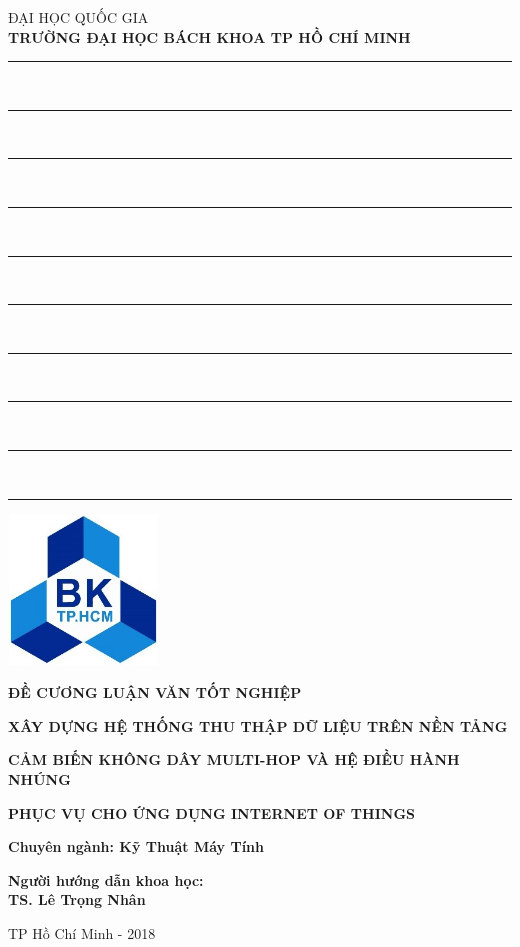 \begin{titlepage}
\begin{center}
{ĐẠI HỌC QUỐC GIA}\\
{\bf TRƯỜNG ĐẠI HỌC BÁCH KHOA TP HỒ CHÍ MINH}\\
\rule{0.1in}{1pt}\ \rule{0.1in}{1pt}\ \rule{0.1in}{1pt}\ \rule{0.1in}{1pt}\ \rule{0.1in}{1pt}\ \rule{0.1in}{1pt}\ \rule{0.1in}{1pt}\ \rule{0.1in}{1pt}\ \rule{0.1in}{1pt}\ \rule{0.1in}{1pt}
\end{center}

\begin{center}
\includegraphics[width=4cm,height=4cm]{logo.jpg}\\
\end{center}

\vspace{0.5cm}
\begin{center}
 {\bf {ĐỀ CƯƠNG LUẬN VĂN TỐT NGHIỆP}}
\end{center}
\vspace{0.7cm}

\begin{center}
\centerline{\bf \td XÂY DỰNG HỆ THỐNG THU THẬP DỮ LIỆU TRÊN NỀN TẢNG}
\vspace{.4 cm}
\centerline{\bf \td  CẢM BIẾN KHÔNG DÂY  MULTI-HOP VÀ HỆ ĐIỀU HÀNH NHÚNG}
\vspace{0.4 cm}
\centerline{\bf \td PHỤC VỤ CHO ỨNG DỤNG INTERNET OF THINGS}
\end{center}


\vspace{.5cm}
\begin{center}
\bf Chuyên ngành: Kỹ Thuật Máy Tính\\
\end{center}

\vspace{1cm}
\begin{center}
\bf Người hướng dẫn khoa học:\\
TS. Lê Trọng Nhân
\end{center}

\vspace{1.5cm}
\vfill
\begin{center}
TP Hồ Chí Minh - 2018
\end{center}
\end{titlepage}
